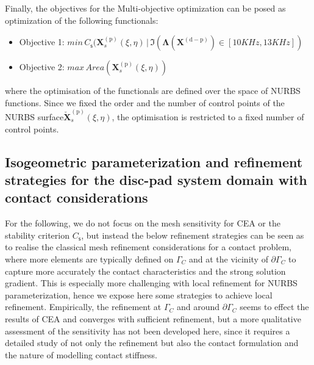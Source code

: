 Finally, the objectives for the Multi-objective optimization can be posed as optimization of the following functionals: 

\begin{itemize}
    \item Objective 1:
$min \, C_{\mathsf s}(\bm X_{s}^{(\mathrm p)}(\xi,\eta)\,|\,\Im(\bm \Lambda(\bm X^{(\mathrm{d-p})})\in[10KHz,13KHz])$
    \item Objective 2:
$max \, Area(\bm X_{s}^{(\mathrm p)}(\xi,\eta))$
\end{itemize}



where the optimisation of the functionals are defined over the space of NURBS functions. Since we fixed the order and the number of control points of the NURBS surface$ \bm {\check{X}}_{s}^{(\mathrm p)}(\xi,\eta)$, the optimisation is restricted to a fixed number of control points.\\ 

\subsection{Isogeometric parameterization and refinement strategies for the disc-pad system domain with contact considerations} \label{subsec:iso_ref_strat}
{For the following, we do not focus on the mesh sensitivity for CEA or the stability criterion $C_{\mathsf s}$, but instead the below refinement strategies can be seen as to realise the classical mesh refinement considerations for a contact problem, where more elements are typically defined on $\Gamma_C$ and at the vicinity of $\partial \Gamma_C$ to capture more accurately the contact characteristics and the strong solution gradient. This is especially more challenging with local refinement for NURBS parameterization, hence we expose here some strategies to achieve local refinement. Empirically, the refinement at $\Gamma_C$ and around $\partial \Gamma_C$ seems to effect the results of CEA and converges with sufficient refinement, but a more qualitative assessment of the sensitivity has not been developed here, since it requires a detailed study of not only the refinement but also the contact formulation and  the nature of modelling contact stiffness.}\\

